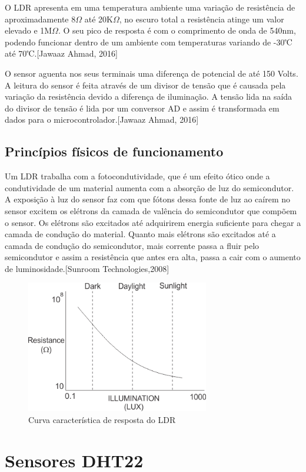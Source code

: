 O LDR apresenta em uma temperatura ambiente uma variação de resistência de aproximadamente 8$\Omega$ até 20K$\Omega$, no escuro total a resistência atinge um valor elevado e 1M$\Omega$. O seu pico de resposta é com o comprimento de onda de 540nm, podendo funcionar dentro de um ambiente com temperaturas variando de -30℃ até 70℃.[Jawaaz Ahmad, 2016]

O sensor aguenta nos seus terminais uma diferença de potencial de até 150 Volts. A leitura do sensor é feita através de um divisor de tensão que é causada pela variação da resistência devido a diferença de iluminação. A tensão lida na saída do divisor de tensão é lida por um conversor AD e assim é transformada em dados para o microcontrolador.[Jawaaz Ahmad, 2016]

\subsection{Princípios físicos de funcionamento}

Um LDR trabalha com a fotocondutividade, que é um efeito ótico onde a condutividade de um material aumenta com a absorção de luz do semicondutor. A exposição à luz do sensor faz com que fótons dessa fonte de luz ao caírem no sensor excitem os elétrons da camada de valência do semicondutor que compõem o sensor. Os elétrons são excitados até adquirirem energia suficiente para chegar a camada de condução do material. Quanto mais elétrons são excitados até a camada de condução do semicondutor, mais corrente passa a fluir pelo semicondutor e assim a resistência que antes era alta, passa a cair com o aumento de luminosidade.[Sunroom Technologies,2008]

\begin{figure}[H]
	\centering
	\includegraphics[width=8cm]{figuras/curva_ldr.png}
	\caption{Curva característica de resposta do LDR} \label{curva_ldr}
\end{figure}

\section{Sensores DHT22}


